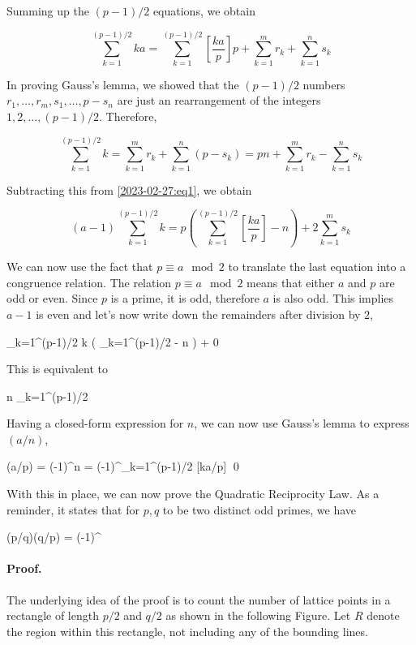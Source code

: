 Summing up the $(p-1)/2$ equations, we obtain

\begin{equation}\label{2023-02-27:eq1}
    \sum_{k=1}^{(p-1)/2} ka = \sum_{k=1}^{(p-1)/2} \left[ \frac{ka}{p} \right] p + \sum_{k=1}^m r_k + \sum_{k=1}^n s_k
\end{equation}

In proving Gauss's lemma, we showed that the $(p-1)/2$ numbers $r_1, \ldots, r_m, s_1, \ldots, p - s_n$ are just an rearrangement of the integers $1, 2, \ldots, (p-1)/2$. Therefore,

\begin{equation*}
    \sum_{k=1}^{(p-1)/2} k  = \sum_{k=1}^m r_k + \sum_{k=1}^n (p - s_k) = pn + \sum_{k=1}^m r_k - \sum_{k=1}^n s_k
\end{equation*}

Subtracting this from \eqref{2023-02-27:eq1}, we obtain

\begin{equation*}
    (a-1) \sum_{k=1}^{(p-1)/2} k = p \left( \sum_{k=1}^{(p-1)/2} \left[ \frac{ka}{p} \right] - n \right) + 2\sum_{k=1}^m s_k 
\end{equation*}

We can now use the fact that $p \equiv a \mod 2$ to translate the last equation into a congruence relation. The relation $p \equiv a \mod 2$ means that either $a$ and $p$ are odd or even. Since $p$ is a prime, it is odd, therefore $a$ is also odd. This implies $a-1$ is even and let's now write down the remainders after division by $2$,

 \cdot \sum_{k=1}^{(p-1)/2} k  \cdot \left( \sum_{k=1}^{(p-1)/2}  - n \right) + 0 
\eee

This is equivalent to

\bee
n \equiv \sum_{k=1}^{(p-1)/2}  
\eee

Having a closed-form expression for $n$, we can now use Gauss's lemma to express $(a/n)$,

\bee
(a/p) = (-1)^n = (-1)^{\sum_{k=1}^{(p-1)/2} [ka/p]} \qed
\eee

With this in place, we can now prove the Quadratic Reciprocity Law. As a reminder, it states that for $p, q$ to be two distinct odd primes, we have

\bee
(p/q)(q/p) = (-1)^{  }
\eee

\paragraph{Proof.} The underlying idea of the proof is to count the number of lattice points in a rectangle of length $p/2$ and $q/2$ as shown in the following Figure. Let $R$ denote the region within this rectangle, not including any of the bounding lines.

